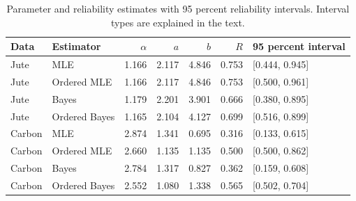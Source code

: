 \begin{table}[htbp]
\centering
\caption{Parameter and reliability estimates with 95 percent reliability intervals. Interval types are explained in the text.}\label{tab:real-estimates}
\small
\begin{tabular}{llrrrrl}
\toprule
Data & Estimator & $\alpha$ & $a$ & $b$ & $R$ & 95 percent interval \\
\midrule
Jute & MLE & 1.166 & 2.117 & 4.846 & 0.753 & [0.444, 0.945] \\
Jute & Ordered MLE & 1.166 & 2.117 & 4.846 & 0.753 & [0.500, 0.961] \\
Jute & Bayes & 1.179 & 2.201 & 3.901 & 0.666 & [0.380, 0.895] \\
Jute & Ordered Bayes & 1.165 & 2.104 & 4.127 & 0.699 & [0.516, 0.899] \\
Carbon & MLE & 2.874 & 1.341 & 0.695 & 0.316 & [0.133, 0.615] \\
Carbon & Ordered MLE & 2.660 & 1.135 & 1.135 & 0.500 & [0.500, 0.862] \\
Carbon & Bayes & 2.784 & 1.317 & 0.827 & 0.362 & [0.159, 0.608] \\
Carbon & Ordered Bayes & 2.552 & 1.080 & 1.338 & 0.565 & [0.502, 0.704] \\
\bottomrule
\end{tabular}
\end{table}
